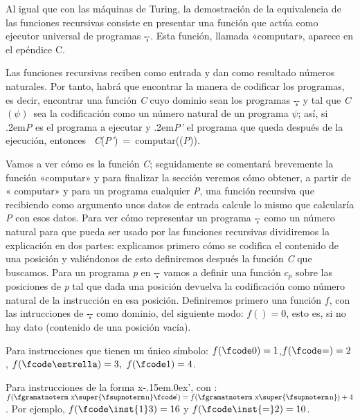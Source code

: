 Al igual que con las máquinas de Turing, la demostración de la equivalencia de las funciones
recursivas consiste en presentar una función que actúa como ejecutor universal de programas \c--.
Esta función, llamada «{\fgabrielen computar}», aparece en el epéndice C.

Las funciones recursivas reciben como entrada y dan como resultado números naturales. Por tanto,
habrá que encontrar la manera de codificar los programas, es decir, encontrar una función {\it C}
cuyo dominio sean los programas \c-- y tal que {\it C$ (\psi) $}\ sea la codificación
como un número natural de un programa $ \psi $; así, si \kern.2em{\it P\/} es el programa
a ejecutar y \kern.2em{\it P'\/} el programa que queda después de la ejecución, entonces \hbox{{\it
C}({\it P'}) = {\fgabrielen computar}(({\it P}))}.

Vamos a ver cómo es la función {\it C}; seguidamente se comentará brevemente la función
«{\fgabrielen computar}» y para finalizar la sección veremos cómo obtener, a partir de «{\fgabrielen
computar}» y para un programa cualquier {\it P}, una función recursiva que recibiendo como argumento
unos datos de entrada calcule lo mismo que calcularía {\it P} con esos datos.
Para ver cómo representar un programa \c-- como un número natural para que pueda ser usado por las
funciones recursivas dividiremos la explicación en dos partes: explicamos primero cómo se codifica
el contenido de una posición y valiéndonos de esto definiremos después la función {\it C} que
buscamos.
Para un programa {\it p} en \c-- vamos a definir una función $ c_p $ sobre las posiciones de {\it p}
tal que dada una posición devuelva la codificación como número natural de la instrucción en esa
posición. Definiremos primero una función $ f $, con las intrucciones de \c-- como dominio, del
siguiente modo:
\listanormal
$ f()= 0$, esto es, si no hay dato (contenido de una posición vacía).

Para instrucciones que tienen un único símbolo:
\espacioej$ f(\hbox{\fcode0})= 1$,\hskip22pt$ f(\hbox{\fcode=})=2 $,\hskip22pt $
f(\hbox{\fcode\estrella})=3, $\hskip22pt $ f(\hbox{\fcode1})=4 $.

Para instrucciones de la forma {\fgramatnoterm x\fcode\kern-.15em\lower.0ex\hbox{’}}, con \nnat:
\espacioej$ f(\hbox{{\fgramatnoterm x\super{\fsupnoterm\kern.1em n}%
\fcode\kern-.15em\lower.0ex\hbox{’}}}) =f(\hbox{{\fgramatnoterm x\super{\fsupnoterm\kern.1em n}}})+4 $.
\finlista
Por ejemplo, $ f(\hbox{{\fcode\inst{1}3}})=16 $ y $ f(\hbox{{\fcode\inst{=}2}})=10 $.

